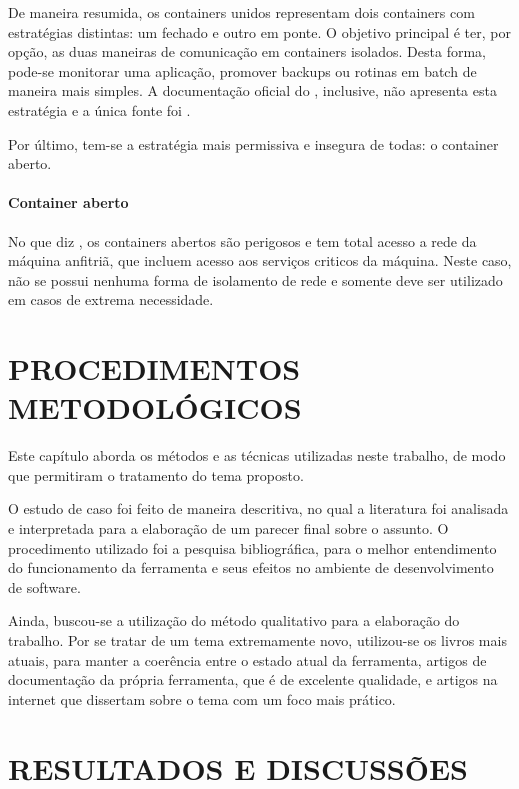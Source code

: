 \documentclass[
	12pt,				%
	openright,			%
	oneside,			%
	a4paper,			%
	chapter=TITLE,		%
	section=TITLE,		%
	english,			%
	french,				%
	spanish,			%
	brazil				%
	]{abntex2}
\begin{document}
De maneira resumida, os containers unidos representam dois containers com estratégias distintas: um fechado e outro em ponte. O objetivo principal é ter, por opção, as duas maneiras de comunicação em containers isolados. Desta forma, pode-se monitorar uma aplicação, promover backups ou rotinas em batch de maneira mais simples. A documentação oficial do , inclusive, não apresenta esta estratégia e a única fonte foi .

Por último, tem-se a estratégia mais permissiva e insegura de todas: o container aberto.

\subsubsection{Container aberto}

No que diz , os containers abertos são perigosos e tem total acesso a rede da máquina anfitriã, que incluem acesso aos serviços criticos da máquina. Neste caso, não se possui nenhuma forma de isolamento de rede e somente deve ser utilizado em casos de extrema necessidade. 

\chapter{PROCEDIMENTOS METODOLÓGICOS}

Este capítulo aborda os métodos e as técnicas utilizadas neste trabalho, de modo que permitiram o tratamento do tema proposto.

O estudo de caso foi feito de maneira descritiva, no qual a literatura foi analisada e interpretada para a elaboração de um parecer final sobre o assunto. O procedimento utilizado foi a pesquisa bibliográfica, para o melhor entendimento do funcionamento da ferramenta e seus efeitos no ambiente de desenvolvimento de software.

Ainda, buscou-se a utilização do método qualitativo para a elaboração do trabalho. Por se tratar de um tema extremamente novo, utilizou-se os livros mais atuais, para manter a coerência entre o estado atual da ferramenta, artigos de documentação da própria ferramenta, que é de excelente qualidade, e artigos na internet que dissertam sobre o tema com um foco mais prático.

\chapter{RESULTADOS E DISCUSSÕES}
\end{document}

